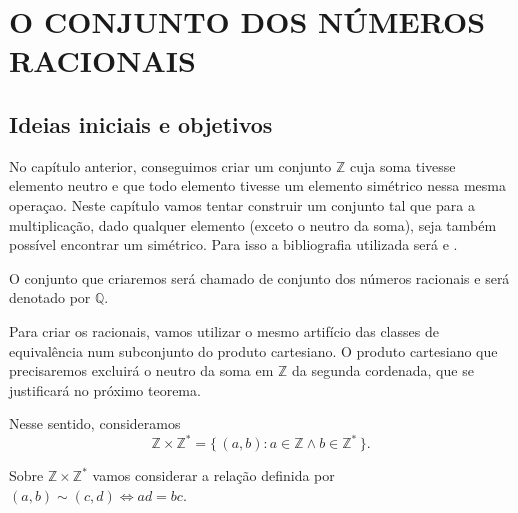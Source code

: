 \documentclass[../main.tex]{subfiles}
\begin{document}
\chapter{O CONJUNTO DOS NÚMEROS RACIONAIS}
\section{Ideias iniciais e objetivos}

No capítulo anterior, conseguimos criar um conjunto $\mathbb{Z}$ cuja soma tivesse elemento neutro e que todo elemento tivesse um elemento simétrico nessa mesma operaçao. Neste capítulo vamos tentar construir um conjunto tal que para a multiplicação, dado qualquer elemento (exceto o neutro da soma), seja também possível encontrar um simétrico. Para isso a bibliografia utilizada será \textcite{domingues-2009} e \textcite{ferreira}.

O conjunto que criaremos será chamado de conjunto dos números racionais e será denotado por $\mathbb{Q}$.

Para criar os racionais, vamos utilizar o mesmo artifício das classes de equivalência num subconjunto do produto cartesiano. O produto cartesiano que precisaremos excluirá o neutro da soma em $\mathbb{Z}$ da segunda cordenada, que se justificará no próximo teorema.

Nesse sentido, consideramos 
 \[ \mathbb{Z} \times \mathbb{Z}^* = \{\, \left( a,b \right) : a \in \mathbb{Z} \land b \in \mathbb{Z}^* \,\}. \]

Sobre $\mathbb{Z} \times \mathbb{Z}^*$ vamos considerar a relação definida por $\left( a,b \right) \sim \left( c,d \right) \iff ad = bc$.
\end{document}
